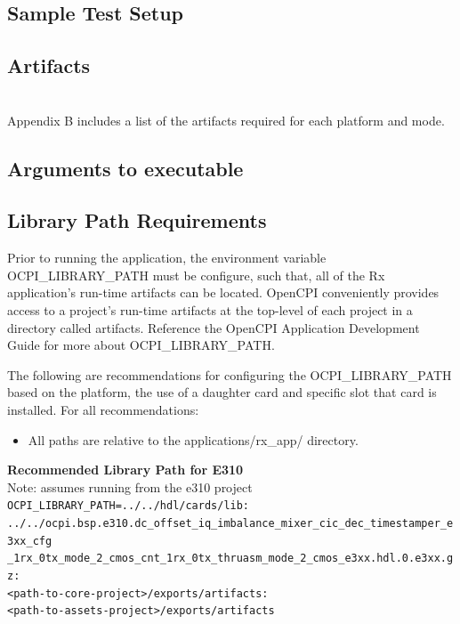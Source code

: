 \subsection{Sample Test Setup}
\assetsdoc
\subsection{Artifacts}
\assetsdoc \\
\noindent Appendix B includes a list of the artifacts required for each platform and mode.
\subsection{Arguments to executable}
\assetsdoc
\subsection{Library Path Requirements}
\noindent Prior to running the application, the environment variable OCPI\_LIBRARY\_PATH must be configure, such that, all of the Rx application's run-time artifacts can be located. OpenCPI conveniently provides access to a project's run-time artifacts at the top-level of each project in a directory called artifacts. Reference the OpenCPI Application Development Guide for more about OCPI\_LIBRARY\_PATH. \par\medskip

\noindent The following are recommendations for configuring the OCPI\_LIBRARY\_PATH based on the platform, the use of a daughter card and specific slot that card is installed. For all recommendations:
\begin{itemize}
  \item All paths are relative to the applications/rx\_app/ directory.\\
\end{itemize}

\noindent\textbf{Recommended Library Path for E310}\\
Note: assumes running from the e310 project \\
\noindent
\verb|OCPI_LIBRARY_PATH=../../hdl/cards/lib:| \\
\verb|../../ocpi.bsp.e310.dc_offset_iq_imbalance_mixer_cic_dec_timestamper_e3xx_cfg| \\
\verb|_1rx_0tx_mode_2_cmos_cnt_1rx_0tx_thruasm_mode_2_cmos_e3xx.hdl.0.e3xx.gz:| \\
\verb|<path-to-core-project>/exports/artifacts:| \\
\verb|<path-to-assets-project>/exports/artifacts| \\
\par\medskip
\pagebreak
